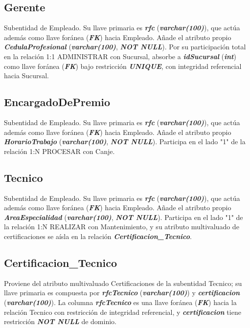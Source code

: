 \documentclass[11pt,letterpaper,spanish]{article}
\begin{document}
\subsection{Gerente}
Subentidad de Empleado. Su llave primaria es \textbf{\textit{rfc}} (\textbf{\textit{varchar(100)}}), que actúa además como llave foránea (\textbf{\textit{FK}}) hacia Empleado. Añade el atributo propio \textbf{\textit{CedulaProfesional}} (\textbf{\textit{varchar(100)}}, \textbf{\textit{NOT NULL}}). Por su participación total en la relación 1:1 ADMINISTRAR con Sucursal, absorbe a \textbf{\textit{idSucursal}} (\textbf{\textit{int}}) como llave foránea (\textbf{\textit{FK}}) bajo restricción \textbf{\textit{UNIQUE}}, con integridad referencial hacia Sucursal.

\subsection{EncargadoDePremio}
Subentidad de Empleado. Su llave primaria es \textbf{\textit{rfc}} (\textbf{\textit{varchar(100)}}), que actúa además como llave foránea (\textbf{\textit{FK}}) hacia Empleado. Añade el atributo propio \textbf{\textit{HorarioTrabajo}} (\textbf{\textit{varchar(100)}}, \textbf{\textit{NOT NULL}}). Participa en el lado "1" de la relación 1:N PROCESAR con Canje.

\subsection{Tecnico}
Subentidad de Empleado. Su llave primaria es \textbf{\textit{rfc}} (\textbf{\textit{varchar(100)}}), que actúa además como llave foránea (\textbf{\textit{FK}}) hacia Empleado. Añade el atributo propio \textbf{\textit{AreaEspecialidad}} (\textbf{\textit{varchar(100)}}, \textbf{\textit{NOT NULL}}). Participa en el lado "1" de la relación 1:N REALIZAR con Mantenimiento, y su atributo multivaluado de certificaciones se aísla en la relación \textbf{\textit{Certificacion\_Tecnico}}.

\subsection{Certificacion\_Tecnico}
Proviene del atributo multivaluado Certificaciones de la subentidad Tecnico; su llave primaria es compuesta por \textbf{\textit{rfcTecnico}} (\textbf{\textit{varchar(100)}}) y \textbf{\textit{certificacion}} (\textbf{\textit{varchar(100)}}). La columna \textbf{\textit{rfcTecnico}} es una llave foránea (\textbf{\textit{FK}}) hacia la relación Tecnico con restricción de integridad referencial, y \textbf{\textit{certificacion}} tiene restricción \textbf{\textit{NOT NULL}} de dominio.
\end{document}
